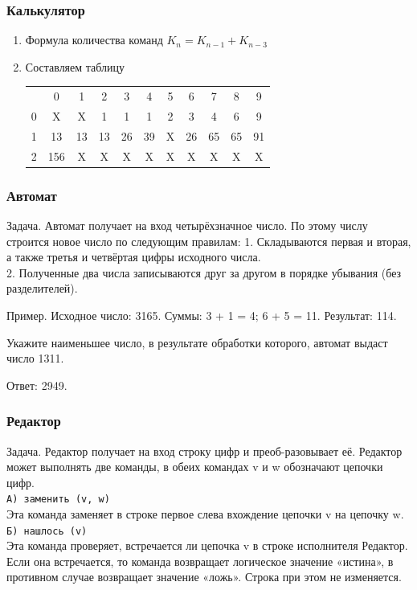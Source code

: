 \begin{frame}[fragile]
\frametitle{Калькулятор}
\begin{enumerate}
	\item Формула количества команд $K_n=K_{n-1}+K_{n-3}$
	\item Составляем таблицу\\
\begin{tabular}{c|c|c|c|c|c|c|c|c|c|c|}
\multicolumn{1}{c}{} & \multicolumn{1}{c}{0} & \multicolumn{1}{c}{1} & \multicolumn{1}{c}{2} & \multicolumn{1}{c}{3} & \multicolumn{1}{c}{4} & \multicolumn{1}{c}{5} & \multicolumn{1}{c}{6} & \multicolumn{1}{c}{7} & \multicolumn{1}{c}{8} & \multicolumn{1}{c}{9}\tabularnewline
\cline{2-11} \cline{3-11} \cline{4-11} \cline{5-11} \cline{6-11} \cline{7-11} \cline{8-11} \cline{9-11} \cline{10-11} \cline{11-11} 
0 & X & X & 1 & 1 & 1 & 2 & 3 & 4 & 6 & 9\tabularnewline
\cline{2-11} \cline{3-11} \cline{4-11} \cline{5-11} \cline{6-11} \cline{7-11} \cline{8-11} \cline{9-11} \cline{10-11} \cline{11-11} 
1 & 13 & 13 & 13 & 26 & 39 & X & 26 & 65 & 65 & 91\tabularnewline
\cline{2-11} \cline{3-11} \cline{4-11} \cline{5-11} \cline{6-11} \cline{7-11} \cline{8-11} \cline{9-11} \cline{10-11} \cline{11-11} 
2 & 156 & X & X & X & X & X & X & X & X & X\tabularnewline
\cline{2-11} \cline{3-11} \cline{4-11} \cline{5-11} \cline{6-11} \cline{7-11} \cline{8-11} \cline{9-11} \cline{10-11} \cline{11-11} 
\end{tabular}
\end{enumerate}


\end{frame}

\begin{frame}[fragile]
\frametitle{Автомат}
Задача. Автомат получает на вход четырёхзначное число. По этому числу строится новое число по следующим правилам:
1. Складываются первая и вторая, а также третья и четвёртая цифры исходного числа.\\
2. Полученные два числа записываются друг за другом в порядке убывания (без разделителей).

Пример. Исходное число: 3165. Суммы: 3 + 1 = 4; 6 + 5 = 11. Результат: 114.

Укажите наименьшее число, в результате обработки которого, автомат выдаст число 1311.

\pause Ответ:  2949.
\end{frame}

\begin{frame}[fragile]
\frametitle{Редактор}
Задача. Редактор получает на вход строку цифр и преоб-разовывает её. Редактор может выполнять две команды, в обеих командах v и w обозначают цепочки цифр.\\
\texttt{А) заменить (v, w)}\\
Эта команда заменяет в строке первое слева вхождение цепочки v на цепочку w. \\
\texttt{Б) нашлось (v)}\\
Эта команда проверяет, встречается ли цепочка v в строке исполнителя Редактор. Если она встречается, то команда возвращает логическое значение «истина», в противном случае возвращает значение «ложь». Строка при этом не изменяется.

\end{frame}


